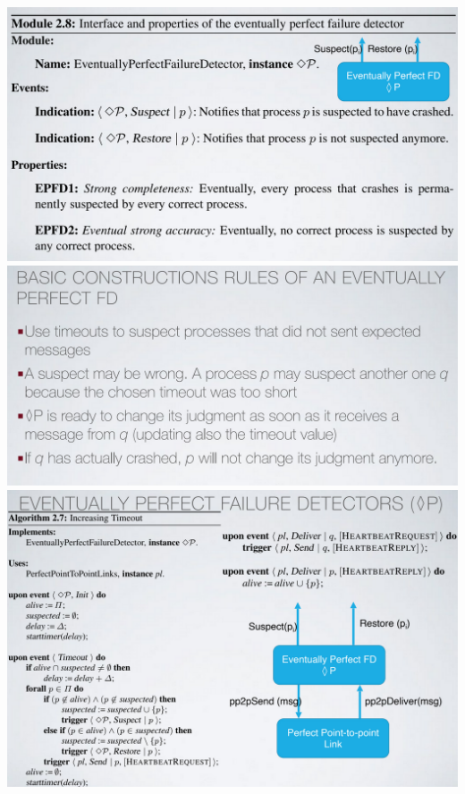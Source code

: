 \documentclass[11pt, a4paper]{article}
\begin{document}
\begin{center}
    \includegraphics[scale=0.5]{img/FD/DiamondPPropertiers.png}
    \includegraphics[scale=0.5]{img/FD/BasicsDiamond.png}
    \includegraphics[scale=0.5]{img/FD/DiamondPAlgo.png}
\end{center}
\end{document}
